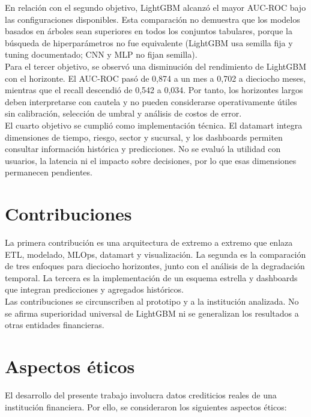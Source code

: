 En relación con el segundo objetivo, LightGBM alcanzó el mayor AUC-ROC bajo las configuraciones disponibles. Esta comparación no demuestra que los modelos basados en árboles sean superiores en todos los conjuntos tabulares, porque la búsqueda de hiperparámetros no fue equivalente (LightGBM usa semilla fija y tuning documentado; CNN y MLP no fijan semilla).\\

Para el tercer objetivo, se observó una disminución del rendimiento de LightGBM con el horizonte. El AUC-ROC pasó de 0,874 a un mes a 0,702 a dieciocho meses, mientras que el recall descendió de 0,542 a 0,034. Por tanto, los horizontes largos deben interpretarse con cautela y no pueden considerarse operativamente útiles sin calibración, selección de umbral y análisis de costos de error.\\

El cuarto objetivo se cumplió como implementación técnica. El datamart integra dimensiones de tiempo, riesgo, sector y sucursal, y los dashboards permiten consultar información histórica y predicciones. No se evaluó la utilidad con usuarios, la latencia ni el impacto sobre decisiones, por lo que esas dimensiones permanecen pendientes.

\section{Contribuciones}

La primera contribución es una arquitectura de extremo a extremo que enlaza ETL, modelado, MLOps, datamart y visualización. La segunda es la comparación de tres enfoques para dieciocho horizontes, junto con el análisis de la degradación temporal. La tercera es la implementación de un esquema estrella y dashboards que integran predicciones y agregados históricos.\\

Las contribuciones se circunscriben al prototipo y a la institución analizada. No se afirma superioridad universal de LightGBM ni se generalizan los resultados a otras entidades financieras.

\section{Aspectos éticos}

El desarrollo del presente trabajo involucra datos crediticios reales de una institución financiera. Por ello, se consideraron los siguientes aspectos éticos:

